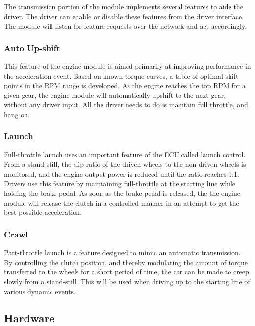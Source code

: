 The transmission portion of the module implements several features to aide the driver. The driver can enable or disable these features from the driver interface. The module will listen for feature requests over the network and act accordingly.

\subsubsection{Auto Up-shift}

This feature of the engine module is aimed primarily at improving performance in the acceleration event. Based on known torque curves, a table of optimal shift points in the RPM range is developed. As the engine reaches the top RPM for a given gear, the engine module will automatically upshift to the next gear, without any driver input. All the driver needs to do is maintain full throttle, and hang on.

\subsubsection{Launch}

Full-throttle launch uses an important feature of the ECU called launch control. From a stand-still, the slip ratio of the driven wheels to the non-driven wheels is monitored, and the engine output power is reduced until the ratio reaches 1:1. Drivers use this feature by maintaining full-throttle at the starting line while holding the brake pedal. As soon as the brake pedal is released, the the engine module will release the clutch in a controlled manner in an attempt to get the best possible acceleration.

\subsubsection{Crawl}

Part-throttle launch is a feature designed to mimic an automatic transmission. By controlling the clutch position, and thereby modulating the amount of torque transferred to the wheels for a short period of time, the car can be made to creep slowly from a stand-still. This will be used when driving up to the starting line of various dynamic events.

\subsection{Hardware \label{sec:design_engine_transmission_hardware}}

